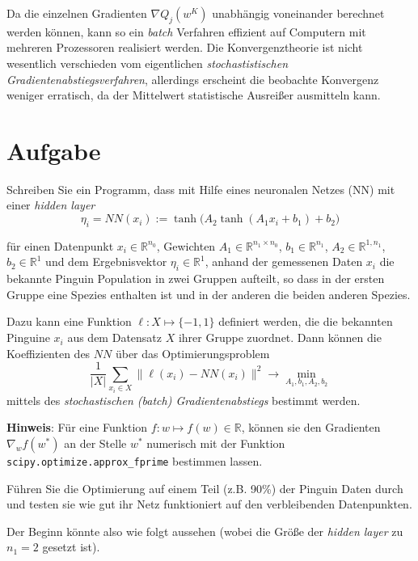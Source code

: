 \documentclass[]{book}
\theoremstyle{definition}
\theoremstyle{definition}
\theoremstyle{definition}
\theoremstyle{definition}
\theoremstyle{remark}
\begin{document}
Da die einzelnen Gradienten \(\nabla Q_j(w^K)\) unabhängig voneinander berechnet werden können, kann so ein \emph{batch} Verfahren effizient auf Computern mit mehreren Prozessoren realisiert werden. Die Konvergenztheorie ist nicht wesentlich verschieden vom eigentlichen \emph{stochastistischen Gradientenabstiegsverfahren}, allerdings erscheint die beobachte Konvergenz weniger erratisch, da der Mittelwert statistische Ausreißer ausmitteln kann.

\hypertarget{aufgabe}{%
\section{Aufgabe}\label{aufgabe}}

Schreiben Sie ein Programm, dass mit Hilfe eines neuronalen Netzes (NN) mit einer \emph{hidden layer}
\begin{equation*}
\eta_i = NN(x_i):=\tanh \bigl (A_2 \tanh (A_1 x_i + b_1) + b_2\bigr )
\end{equation*}

für einen Datenpunkt \(x_i \in \mathbb R^{n_0}\), Gewichten \(A_1 \in \mathbb R^{n_1 \times n_0}\), \(b_1 \in \mathbb R^{n_1}\), \(A_2 \in \mathbb R^{1, n_1}\), \(b_2 \in \mathbb R^{1}\) und dem Ergebnisvektor \(\eta_i\in \mathbb R^{1}\), anhand der gemessenen Daten \(x_i\) die bekannte Pinguin Population in zwei Gruppen aufteilt, so dass in der ersten Gruppe eine Spezies enthalten ist und in der anderen die beiden anderen Spezies.

Dazu kann eine Funktion \(\ell \colon X \mapsto \{-1, 1\}\) definiert werden, die die bekannten Pinguine \(x_i\) aus dem Datensatz \(X\) ihrer Gruppe zuordnet. Dann können die Koeffizienten des \(NN\) über das Optimierungsproblem
\begin{equation*}
\frac{1}{|X|}\sum_{x_i \in X} \|\ell(x_i)-NN(x_i)\|^2 \to \min_{A_1, b_1, A_2, b_2}
\end{equation*}
mittels des \emph{stochastischen (batch) Gradientenabstiegs} bestimmt werden.

\textbf{Hinweis}: Für eine Funktion \(f \colon w \mapsto f(w) \in \mathbb R\), können sie den Gradienten \(\nabla_w f(w^*)\) an der Stelle \(w^*\) numerisch mit der Funktion \texttt{scipy.optimize.approx\_fprime} bestimmen lassen.

Führen Sie die Optimierung auf einem Teil (z.B. 90\%) der Pinguin Daten durch und testen sie wie gut ihr Netz funktioniert auf den verbleibenden Datenpunkten.

Der Beginn könnte also wie folgt aussehen (wobei die Größe der \emph{hidden layer} zu \(n_1=2\) gesetzt ist).
\end{document}
